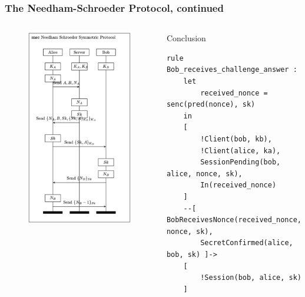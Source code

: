 \documentclass[aspectratio=169,t,xcolor=table]{beamer}
\begin{document}
\begin{frame}[fragile]
    \frametitle{The Needham-Schroeder Protocol, continued}
    \begin{columns}
        \begin{figure}
            \centering
            \includegraphics[width=.8\textwidth]{images/NS.png}
        \end{figure}
        \begin{block}{Conclusion}
            \begin{lstlisting}[language=Tamarin]
rule Bob_receives_challenge_answer :
    let
        received_nonce = senc(pred(nonce), sk)
    in
    [
        !Client(bob, kb),
        !Client(alice, ka),
        SessionPending(bob, alice, nonce, sk),
        In(received_nonce)
    ]
    --[ BobReceivesNonce(received_nonce, nonce, sk),
        SecretConfirmed(alice, bob, sk) ]->
    [
        !Session(bob, alice, sk)
    ]\end{lstlisting}
        \end{block}
    \end{columns}
\end{frame}
\end{document}
